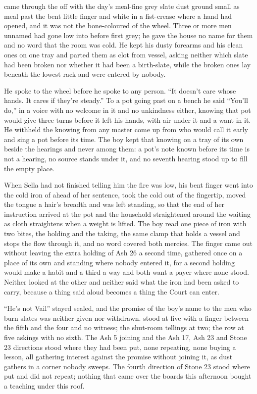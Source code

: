 \scenebreak

 came through the  off  with the day's meal-fine grey slate dust ground small as meal past the bent little finger and white in a fist-crease where a hand had opened, and it was not the bone-coloured  of the wheel. Three or more men unnamed had gone low into  before first grey; he gave the house no name for them and no word that the room was cold. He kept his dusty forearms and his clean ones on one tray and parted them as clot from vessel, asking neither which slate had been broken nor whether it had been a birth-slate, while the broken ones lay beneath the lowest rack and were entered by nobody.

He spoke to the wheel before he spoke to any person. “It doesn't care whose hands. It cares if they're steady.” To a pot going past on a bench he said “You'll do,” in a voice with no welcome in it and no unkindness either, knowing  that pot would give three turns before it left his hands, with air under it and a want in it. He withheld the knowing from any master come up from  who would call it early and sing a pot before its time. The boy kept that knowing on a tray of its own beside the hearings and never among them: a pot's note known before its time is not a hearing, no source stands under it, and no seventh hearing stood up to fill the empty place.

When Sella had not finished telling him the fire was low, his bent finger went into the cold iron of  ahead of her sentence, took the cold out of the fingertip, moved the tongue a hair's breadth and was left standing, so that the end of her instruction arrived at the pot and the household straightened around the waiting as cloth straightens when a weight is lifted. The boy read one piece of iron with two bites, the holding and the taking, the same clamp that holds a vessel and stops the flow through it, and no  word covered both mercies. The finger came out without leaving the extra holding of Ash 26 a second time, gathered once on a place of its own and standing where nobody entered it, for a second holding would make a habit and a third a way and both want a payer where none stood. Neither looked at the other and neither said what the iron had been asked to carry, because a thing said aloud becomes a thing the Court can enter.

“He's not Vail” stayed sealed, and the promise of the boy's name to the men who burn slates was neither given nor withdrawn.  stood at five with a finger between the fifth and the four and no witness; the shut-room tellings at two; the row at five askings with no sixth. The Ash 5 joining and the Ash 17, Ash 23 and Stone 23 directions stood where they had been put, none repeating, none buying a lesson, all gathering interest against the promise without joining it, as dust gathers in a corner nobody sweeps. The fourth direction of Stone 23 stood where put and did not repeat; nothing that came over the boards this afternoon bought a teaching under this roof.

